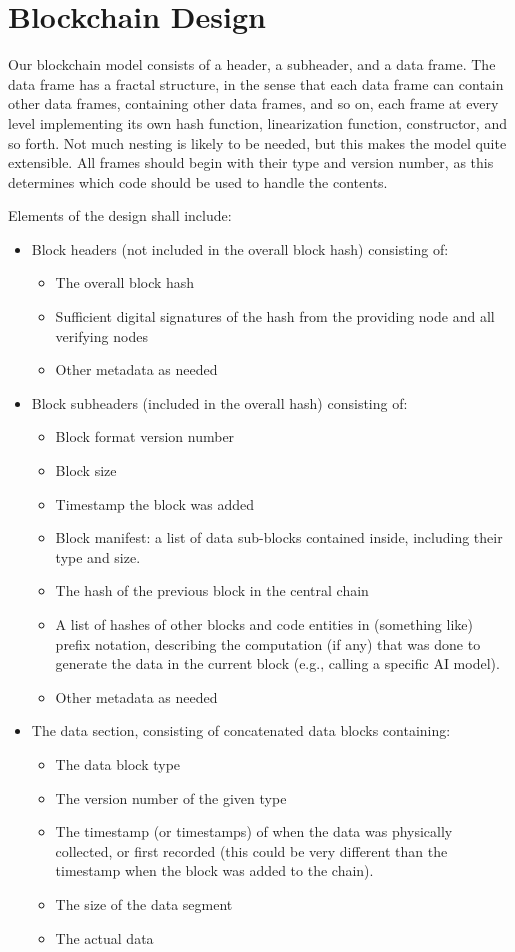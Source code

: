 \documentclass[12pt]{article}
\begin{document}
\section{Blockchain Design}
Our blockchain model consists of a header, a subheader, and a data frame. The data frame has a fractal structure, in the sense that each data frame can contain other data frames, containing other data frames, and so on, each frame at every level implementing its own hash function, linearization function, constructor, and so forth. Not much nesting is likely to be needed, but this makes the model quite extensible. All frames should begin with their type and version number, as this determines which code should be used to handle the contents.

Elements of the design shall include:
\begin{itemize}
\item Block headers (not included in the overall block hash) consisting of:
	\begin{itemize}
	\item The overall block hash
	\item Sufficient digital signatures of the hash from the providing node and all verifying nodes
	\item Other metadata as needed
	\end{itemize}
\item Block subheaders (included in the overall hash) consisting of:
	\begin{itemize}
	\item Block format version number
	\item Block size
	\item Timestamp the block was added
	\item Block manifest: a list of data sub-blocks contained inside, including their type and size.
	\item The hash of the previous block in the central chain
	\item A list of hashes of other blocks and code entities in (something like) prefix notation, describing the computation (if any) that was done to generate the data in the current block (e.g., calling a specific AI model).
	\item Other metadata as needed
	\end{itemize}
\item The data section, consisting of concatenated data blocks containing:
	\begin{itemize}
	\item The data block type
	\item The version number of the given type
	\item The timestamp (or timestamps) of when the data was physically collected, or first recorded (this could be very different than the timestamp when the block was added to the chain).
	\item The size of the data segment
	\item The actual data
	\end{itemize}
\end{itemize}
\end{document}
